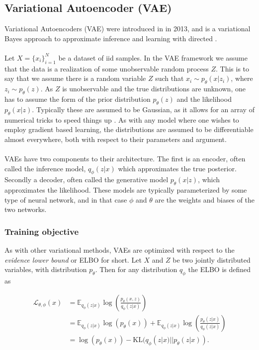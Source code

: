 \documentclass[../../thesis.tex]{subfiles}
\begin{document}
\subsection{Variational Autoencoder (VAE)}
Variational Autoencoders (VAE) were introduced in \cite{kingma2022autoencoding} in 2013, and is a variational Bayes approach to approximate inference and learning with directed . 
\\\\

Let $X = \{x_i\}_{i=1}^{N}$ be a dataset of iid samples. In the VAE framework we assume that the data is a realization of some unobservable random process $Z$. This is to say that we assume there is a random variable $Z$ such that $x_i \sim p_{\theta}(x|z_i)$, where $z_i \sim p_{\theta}(z)$. As $Z$ is unobservable and the true distributions are unknown, one has to assume the form of the prior distribution $p_{\theta}(z)$ and the likelihood $p_{\theta}(x|z)$. Typically these are assumed to be Gaussian, as it allows for an array of numerical tricks to speed things up . As with any model where one wishes to employ gradient based learning, the distributions are assumed to be differentiable almost everywhere, both with respect to their parameters and argument. \\\\
VAEs have two components to their architecture. The first is an encoder, often called the inference model, $q_\phi(z|x)$ which approximates the true posterior. Secondly a decoder, often called the generative model $p_\theta(x|z)$, which approximates the likelihood. These models are typically parameterized by some type of neural network, and in that case $\phi$ and $\theta$ are the weights and biases of the two networks. 

\subsubsection{Training objective}

As with other variational methods, VAEs are optimized with respect to the \textit{evidence lower bound} or ELBO for short. Let $X$ and $Z$ be two jointly distributed variables, with distribution $p_\theta$. Then for any distribution $q_\phi$ the ELBO is defined as

\begin{equation}
    \begin{aligned}
        \label{eq:ELBO}
        \mathcal{L}_{\theta,\phi}(x) 
        &= \mathbb{E}_{q_\phi(z|x)} \log \left( \frac{p_\theta(x,z)}{q_\phi(z|x)}\right) \\ 
        &=  \mathbb{E}_{q_\phi(z|x)} \log \left( p_\theta(x)\right) + \mathbb{E}_{q_\phi(z|x)} \log \left( \frac{p_\theta(z|x)}{q_\phi(z|x)}\right) \\
        &= \log \left( p_\theta(x)\right) - \textrm{KL}(q_\phi(z|x)|| p_\theta(z|x)).
    \end{aligned}
\end{equation}
\end{document}
